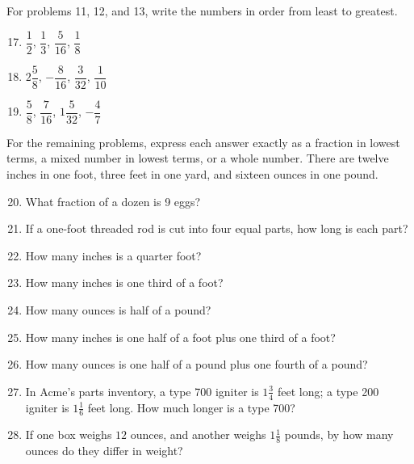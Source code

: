 \documentclass[12pt]{article}
\begin{document}
For problems 11, 12, and 13, write the numbers in order from least to greatest.
\begin{multicols}{2}
\begin{enumerate}
\setcounter{enumi}{16}

\item \hspace{0.5in} $\dfrac{1}{2}$, $\dfrac{1}{3}$, $\dfrac{5}{16}$, $\dfrac{1}{8}$ 
  \vspace{0.25in}

\item \hspace{0.5in} $2\dfrac{5}{8}$, $-\dfrac{8}{16}$, $\dfrac{3}{32}$, $\dfrac{1}{10}$ 
  \vspace{0.25in}

\item \hspace{0.5in} $\dfrac{5}{8}$, $\dfrac{7}{16}$, $1\dfrac{5}{32}$, $-\dfrac{4}{7}$ 
  \vspace{0.25in}

\pagebreak
\end{enumerate}
\end{multicols}
For the remaining problems, express each answer exactly as a fraction in lowest terms, a mixed number in lowest terms, or a whole number. There are twelve inches in one foot, three feet in one yard, and sixteen ounces in one pound.  
\begin{enumerate}
\setcounter{enumi}{19}
		\newcommand{\spacing}{\vspace{0.50in}}
\item What fraction of a dozen is 9 eggs? 
\spacing

\item If a one-foot threaded rod is cut into four equal parts, how long is each part?
\spacing

\item How many inches is a quarter foot? 
\spacing

\item How many inches is one third of a foot? 
\spacing

\item How many ounces is half of a pound? 
\spacing

\item How many inches is one half of a foot plus one third of a foot?  
\spacing

\item How many ounces is one half of a pound plus one fourth of a pound?  
\spacing

\item In Acme's parts inventory, a type 700 igniter is $1\frac{3}{4}$ feet long; a type 200 igniter is $1\frac{1}{6}$ feet long. How much longer is a type 700? 
\spacing

\item If one box weighs $12$ ounces, and another weighs $1\frac{1}{8}$ pounds, by how many ounces do they differ in weight? 
\spacing

\end{enumerate}
\end{document}
